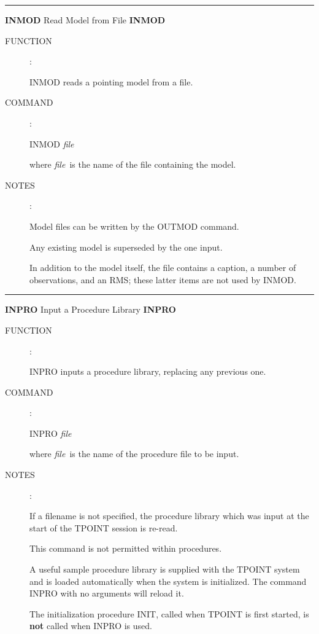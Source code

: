 
\goodbreak
\rule{\textwidth}{0.3mm}
{\Large {\bf INMOD} \hfill Read Model from File \hfill {\bf INMOD}}
\begin{description}
\item [FUNCTION]:

INMOD reads a pointing model from a file.

\item [COMMAND]:

\begin{cmd}
\> \> INMOD {\it file}
\end{cmd}

where {\it file}\, is the name of the file containing the model.

\item [NOTES]:

Model files can be written by the OUTMOD command.

Any existing model is superseded by the one input.

In addition to the model itself, the file contains a
caption, a number of observations, and an RMS;  these latter
items are not used by INMOD.

\end{description}


\goodbreak
\rule{\textwidth}{0.3mm}
{\Large {\bf INPRO} \hfill Input a Procedure Library \hfill {\bf INPRO}}
\begin{description}
\item [FUNCTION]:

INPRO inputs a procedure library, replacing any
previous one.

\item [COMMAND]:

\begin{cmd}
\> \> INPRO {\it file}
\end{cmd}

where {\it file}\, is the name of the procedure file to be input.

\item [NOTES]:

If a filename is not specified, the procedure library which was input
at the start of the TPOINT session is re-read.

This command is not permitted within procedures.

A useful sample procedure library
is supplied with the TPOINT
system and is loaded automatically when the system is initialized.
The command \mbox{INPRO} with no arguments will reload it.

The initialization procedure INIT, called when
TPOINT is first started, is {\bf not} called when
INPRO is used.

\end{description}

